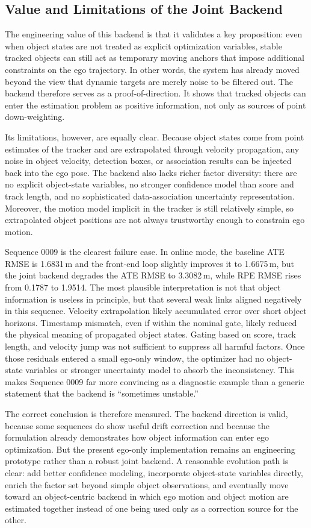 \documentclass[a4paper,12pt]{article}
\begin{document}
\subsection{Value and Limitations of the Joint Backend}
The engineering value of this backend is that it validates a key proposition: even when object states are not treated as explicit optimization variables, stable tracked objects can still act as temporary moving anchors that impose additional constraints on the ego trajectory. In other words, the system has already moved beyond the view that dynamic targets are merely noise to be filtered out. The backend therefore serves as a proof-of-direction. It shows that tracked objects can enter the estimation problem as positive information, not only as sources of point down-weighting.

Its limitations, however, are equally clear. Because object states come from point estimates of the tracker and are extrapolated through velocity propagation, any noise in object velocity, detection boxes, or association results can be injected back into the ego pose. The backend also lacks richer factor diversity: there are no explicit object-state variables, no stronger confidence model than score and track length, and no sophisticated data-association uncertainty representation. Moreover, the motion model implicit in the tracker is still relatively simple, so extrapolated object positions are not always trustworthy enough to constrain ego motion.

Sequence 0009 is the clearest failure case. In online mode, the baseline ATE RMSE is 1.6831\,m and the front-end loop slightly improves it to 1.6675\,m, but the joint backend degrades the ATE RMSE to 3.3082\,m, while RPE RMSE rises from 0.1787 to 1.9514. The most plausible interpretation is not that object information is useless in principle, but that several weak links aligned negatively in this sequence. Velocity extrapolation likely accumulated error over short object horizons. Timestamp mismatch, even if within the nominal gate, likely reduced the physical meaning of propagated object states. Gating based on score, track length, and velocity jump was not sufficient to suppress all harmful factors. Once those residuals entered a small ego-only window, the optimizer had no object-state variables or stronger uncertainty model to absorb the inconsistency. This makes Sequence 0009 far more convincing as a diagnostic example than a generic statement that the backend is ``sometimes unstable.''

The correct conclusion is therefore measured. The backend direction is valid, because some sequences do show useful drift correction and because the formulation already demonstrates how object information can enter ego optimization. But the present ego-only implementation remains an engineering prototype rather than a robust joint backend. A reasonable evolution path is clear: add better confidence modeling, incorporate object-state variables directly, enrich the factor set beyond simple object observations, and eventually move toward an object-centric backend in which ego motion and object motion are estimated together instead of one being used only as a correction source for the other.
\end{document}
